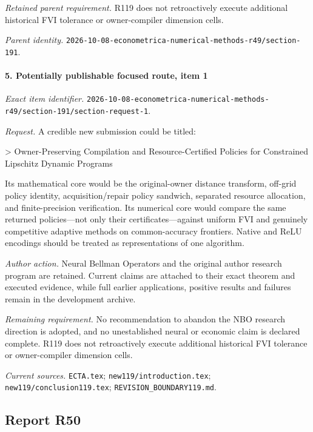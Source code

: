 \par\emph{Retained parent requirement.} R119 does not retroactively execute additional historical FVI tolerance or owner-compiler dimension cells.

\par\emph{Parent identity.} \nolinkurl{2026-10-08-econometrica-numerical-methods-r49/section-191}.

\paragraph{5. Potentially publishable focused route, item 1}

\emph{Exact item identifier.} \nolinkurl{2026-10-08-econometrica-numerical-methods-r49/section-191/section-request-1}.

\par\emph{Request.} A credible new submission could be titled:

> Owner-Preserving Compilation and Resource-Certified Policies for Constrained Lipschitz Dynamic Programs

Its mathematical core would be the original-owner distance transform, off-grid policy identity, acquisition/\allowbreak{}repair policy sandwich, separated resource allocation, and finite-precision verification. Its numerical core would compare the same returned policies---not only their certificates---against uniform FVI and genuinely competitive adaptive methods on common-accuracy frontiers. Native and ReLU encodings should be treated as representations of one algorithm.

\par\emph{Author action.} Neural Bellman Operators and the original author research program are retained. Current claims are attached to their exact theorem and executed evidence, while full earlier applications, positive results and failures remain in the development archive.

\par\emph{Remaining requirement.} No recommendation to abandon the NBO research direction is adopted, and no unestablished neural or economic claim is declared complete. R119 does not retroactively execute additional historical FVI tolerance or owner-compiler dimension cells.

\par\emph{Current sources.} \nolinkurl{ECTA.tex}; \nolinkurl{new119/introduction.tex}; \nolinkurl{new119/conclusion119.tex}; \nolinkurl{REVISION_BOUNDARY119.md}.

\subsection{Report R50}

